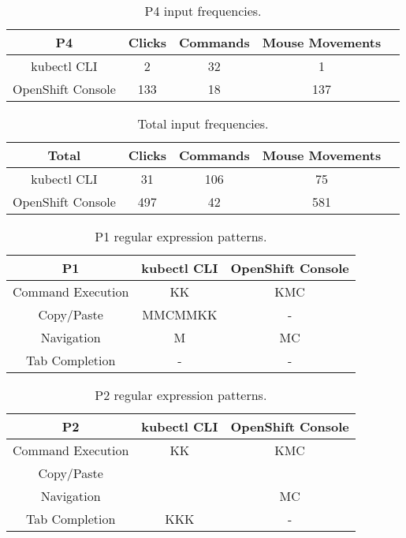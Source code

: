 \documentclass[11pt, oneside]{article}   	%
\begin{document}
\begin{table}
 \centering
  \begin{tabular}{ | c | c | c | c | c | } 
  \hline
  P4 & Clicks & Commands & Mouse Movements \\ 
  \hline
  kubectl CLI & 2 & 32 & 1 \\ 
  \hline
  OpenShift Console & 133 & 18 & 137 \\ 
  \hline
  \end{tabular}
 \caption{P4 input frequencies.}
 \label{table:t4}
\end{table}

\begin{table}
 \centering
  \begin{tabular}{ | c | c | c | c | c | } 
  \hline
  Total & Clicks & Commands & Mouse Movements \\ 
  \hline
  kubectl CLI & 31 & 106 & 75 \\ 
  \hline
  OpenShift Console & 497 & 42 & 581 \\ 
  \hline
  \end{tabular}
 \caption{Total input frequencies.}
 \label{table:t5}
\end{table}

\begin{table}
 \centering
  \begin{tabular}{ | c | c | c | } 
  \hline
  P1 & kubectl CLI & OpenShift Console \\ 
  \hline
  Command Execution & KK & KMC \\ 
  \hline
  Copy/Paste &MMCMMKK & - \\
  \hline
  Navigation & M & MC \\
  \hline
  Tab Completion & - & - \\
  \hline
  \end{tabular}
 \caption{P1 regular expression patterns.}
 \label{table:t6}
\end{table}

\begin{table}
 \centering
  \begin{tabular}{ | c | c | c | } 
  \hline
  P2 & kubectl CLI & OpenShift Console \\ 
  \hline
  Command Execution & KK & KMC \\ 
  \hline
  Copy/Paste & & \\
  \hline
  Navigation & & MC \\
  \hline
  Tab Completion & KKK & - \\
  \hline
  \end{tabular}
 \caption{P2 regular expression patterns.}
 \label{table:t7}
\end{table}
\end{document}

